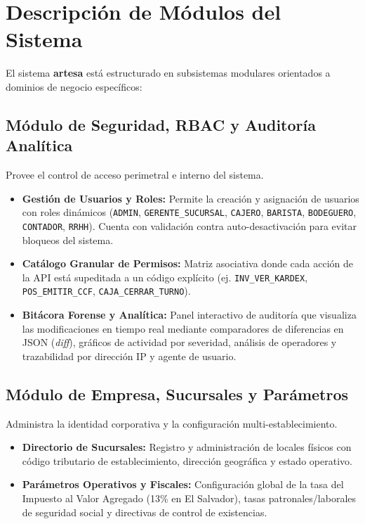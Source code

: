 \section{Descripción de Módulos del Sistema}
\label{sec:descripcion_modulos}

El sistema \textbf{artesa} está estructurado en subsistemas modulares orientados a dominios de negocio específicos:

\subsection{Módulo de Seguridad, RBAC y Auditoría Analítica}
Provee el control de acceso perimetral e interno del sistema.
\begin{itemize}
    \item \textbf{Gestión de Usuarios y Roles:} Permite la creación y asignación de usuarios con roles dinámicos (\texttt{ADMIN}, \texttt{GERENTE\_SUCURSAL}, \texttt{CAJERO}, \texttt{BARISTA}, \texttt{BODEGUERO}, \texttt{CONTADOR}, \texttt{RRHH}). Cuenta con validación contra auto-desactivación para evitar bloqueos del sistema.
    \item \textbf{Catálogo Granular de Permisos:} Matriz asociativa donde cada acción de la API está supeditada a un código explícito (ej. \texttt{INV\_VER\_KARDEX}, \texttt{POS\_EMITIR\_CCF}, \texttt{CAJA\_CERRAR\_TURNO}).
    \item \textbf{Bitácora Forense y Analítica:} Panel interactivo de auditoría que visualiza las modificaciones en tiempo real mediante comparadores de diferencias en JSON (\textit{diff}), gráficos de actividad por severidad, análisis de operadores y trazabilidad por dirección IP y agente de usuario.
\end{itemize}

\subsection{Módulo de Empresa, Sucursales y Parámetros}
Administra la identidad corporativa y la configuración multi-establecimiento.
\begin{itemize}
    \item \textbf{Directorio de Sucursales:} Registro y administración de locales físicos con código tributario de establecimiento, dirección geográfica y estado operativo.
    \item \textbf{Parámetros Operativos y Fiscales:} Configuración global de la tasa del Impuesto al Valor Agregado (13\% en El Salvador), tasas patronales/laborales de seguridad social y directivas de control de existencias.
\end{itemize}

